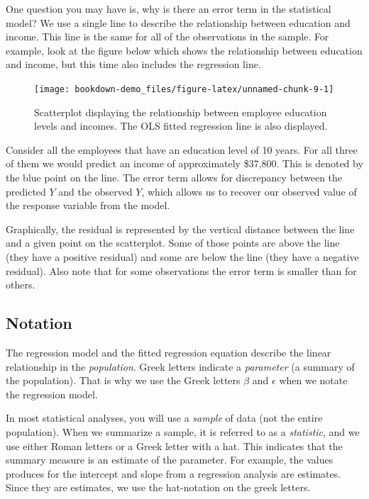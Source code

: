 \documentclass[]{book}
\theoremstyle{definition}
\theoremstyle{definition}
\theoremstyle{definition}
\theoremstyle{remark}
\begin{document}
One question you may have is, why is there an error term in the
statistical model? We use a single line to describe the relationship
between education and income. This line is the same for all of the
observations in the sample. For example, look at the figure below which
shows the relationship between education and income, but this time also
includes the regression line.

\begin{figure}
\texttt{[image: bookdown-demo\_files/figure-latex/unnamed-chunk-9-1]} \caption{Scatterplot displaying the relationship between employee education levels and incomes. The OLS fitted regression line is also displayed.}\label{fig:unnamed-chunk-9}
\end{figure}

Consider all the employees that have an education level of 10 years. For
all three of them we would predict an income of approximately \$37,800.
This is denoted by the blue point on the line. The error term allows for
discrepancy between the predicted \(Y\) and the observed \(Y\), which
allows us to recover our observed value of the response variable from
the model.

Graphically, the residual is represented by the vertical distance
between the line and a given point on the scatterplot. Some of those
points are above the line (they have a positive residual) and some are
below the line (they have a negative residual). Also note that for some
observations the error term is smaller than for others.

\hypertarget{notation}{%
\subsection{Notation}\label{notation}}

The regression model and the fitted regression equation describe the
linear relationship in the \emph{population}. Greek letters indicate a
\emph{parameter} (a summary of the population). That is why we use the
Greek letters \(\beta\) and \(\epsilon\) when we notate the regression
model.

In most statistical analyses, you will use a \emph{sample} of data (not
the entire population). When we summarize a sample, it is referred to as
a \emph{statistic}, and we use either Roman letters or a Greek letter
with a hat. This indicates that the summary measure is an estimate of
the parameter. For example, the values produces for the intercept and
slope from a regression analysis are estimates. Since they are
estimates, we use the hat-notation on the greek letters.
\end{document}
